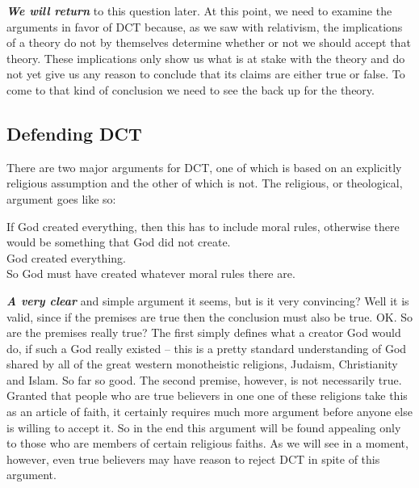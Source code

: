 \documentclass[12pt, openany]{book}
\begin{document}
\textbf{\emph{We will return}} to this question later. At this point, we need to examine the arguments in favor of DCT because, as we saw with relativism, the implications of a theory do not by themselves determine whether or not we should accept that theory. These implications only show us what is at stake with the theory and do not yet give us any reason to conclude that its claims are either true or false. To come to that kind of conclusion we need to see the back up for the theory.

\hypertarget{defending-dct}{%
\subsection*{Defending DCT}\label{defending-dct}}


There are two major arguments for DCT, one of which is based on an explicitly religious assumption and the other of which is not. The religious, or theological, argument goes like so:

\begin{center}

\begin{argument}

If God created everything, then this has to include moral rules, otherwise there would be something that God did not create.\\
God created everything.\\

So God must have created whatever moral rules there are.

\end{argument}

\end{center}

\textbf{\emph{A very clear}} and simple argument it seems, but is it very convincing? Well it is valid, since if the premises are true then the conclusion must also be true. OK. So are the premises really true? The first simply defines what a creator God would do, if such a God really existed -- this is a pretty standard understanding of God shared by all of the great western monotheistic religions, Judaism, Christianity and Islam. So far so good. The second premise, however, is not necessarily true. Granted that people who are true believers in one one of these religions take this as an article of faith, it certainly requires much more argument before anyone else is willing to accept it. So in the end this argument will be found appealing only to those who are members of certain religious faiths. As we will see in a moment, however, even true believers may have reason to reject DCT in spite of this argument.
\end{document}
